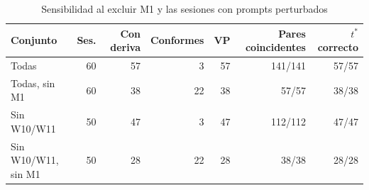 \begin{table}[!t]
\caption{Sensibilidad al excluir M1 y las sesiones con prompts perturbados}
\label{tab:exclusions}
\centering\footnotesize
\begin{tabular*}{\textwidth}{@{\extracolsep{\fill}}lrrrrrr}
\hline
Conjunto & Ses. & Con deriva & Conformes & VP & Pares coincidentes & $t^*$ correcto\\\hline
Todas & 60 & 57 & 3 & 57 & 141/141 & 57/57\\
Todas, sin M1 & 60 & 38 & 22 & 38 & 57/57 & 38/38\\
Sin W10/W11 & 50 & 47 & 3 & 47 & 112/112 & 47/47\\
Sin W10/W11, sin M1 & 50 & 28 & 22 & 28 & 38/38 & 28/28\\
\hline\end{tabular*}\end{table}
